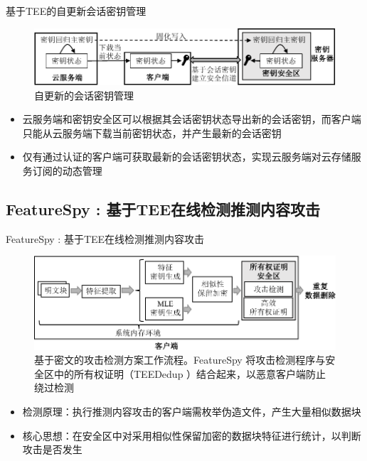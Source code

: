 \documentclass{beamer}
\newcommand{\sysnameS}{TEEDedup }
\newcommand{\sysnameF}{FeatureSpy }
\begin{document}
\begin{frame}{基于TEE的自更新会话密钥管理}
    \begin{figure}[!htb]
        \centering
        \includegraphics[width=\textwidth]{../pic/sgxdedup/keyRegression.pdf}
        \caption{自更新的会话密钥管理}
        \label{fig:sgxdedup-keymanage}
      \end{figure}
      \vspace{-1em}
      \begin{itemize}
        \item 云服务端和密钥安全区可以根据其会话密钥状态导出新的会话密钥，而客户端只能从云服务端下载当前密钥状态，并产生最新的会话密钥
        \item 仅有通过认证的客户端可获取最新的会话密钥状态，实现云服务端对云存储服务订阅的动态管理
    \end{itemize}
\end{frame}

\subsection{\sysnameF: 基于TEE在线检测推测内容攻击}

\begin{frame}{\sysnameF: 基于TEE在线检测推测内容攻击}
    \begin{figure}[!htb]
        \centering
        \includegraphics[width=\textwidth]{../pic/featurespy/architecture.pdf}
        \caption{基于密文的攻击检测方案工作流程。\sysnameF 将攻击检测程序与安全区中的所有权证明（\sysnameS ）结合起来，以恶意客户端防止绕过检测}
        \label{fig:featurespy-architecture-secure}
    \end{figure}
    \vspace{-1em}
    \begin{itemize}
        \item 检测原理：执行推测内容攻击的客户端需枚举伪造文件，产生大量相似数据块
        \item 核心思想：在安全区中对采用相似性保留加密的数据块特征进行统计，以判断攻击是否发生
    \end{itemize}
\end{frame}
\end{document}
